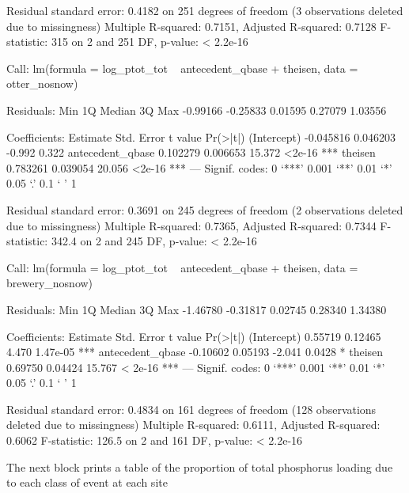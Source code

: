 \documentclass[12pt]{article}
\begin{document}
\begin{Schunk}
\begin{Soutput}
Residual standard error: 0.4182 on 251 degrees of freedom
  (3 observations deleted due to missingness)
Multiple R-squared: 0.7151,	Adjusted R-squared: 0.7128 
F-statistic:   315 on 2 and 251 DF,  p-value: < 2.2e-16 
\end{Soutput}
\begin{Soutput}
Call:
lm(formula = log_ptot_tot ~ antecedent_qbase + theisen, data = otter_nosnow)

Residuals:
     Min       1Q   Median       3Q      Max 
-0.99166 -0.25833  0.01595  0.27079  1.03556 

Coefficients:
                  Estimate Std. Error t value Pr(>|t|)    
(Intercept)      -0.045816   0.046203  -0.992    0.322    
antecedent_qbase  0.102279   0.006653  15.372   <2e-16 ***
theisen           0.783261   0.039054  20.056   <2e-16 ***
---
Signif. codes:  0 ‘***’ 0.001 ‘**’ 0.01 ‘*’ 0.05 ‘.’ 0.1 ‘ ’ 1 

Residual standard error: 0.3691 on 245 degrees of freedom
  (2 observations deleted due to missingness)
Multiple R-squared: 0.7365,	Adjusted R-squared: 0.7344 
F-statistic: 342.4 on 2 and 245 DF,  p-value: < 2.2e-16 
\end{Soutput}
\begin{Soutput}
Call:
lm(formula = log_ptot_tot ~ antecedent_qbase + theisen, data = brewery_nosnow)

Residuals:
     Min       1Q   Median       3Q      Max 
-1.46780 -0.31817  0.02745  0.28340  1.34380 

Coefficients:
                 Estimate Std. Error t value Pr(>|t|)    
(Intercept)       0.55719    0.12465   4.470 1.47e-05 ***
antecedent_qbase -0.10602    0.05193  -2.041   0.0428 *  
theisen           0.69750    0.04424  15.767  < 2e-16 ***
---
Signif. codes:  0 ‘***’ 0.001 ‘**’ 0.01 ‘*’ 0.05 ‘.’ 0.1 ‘ ’ 1 

Residual standard error: 0.4834 on 161 degrees of freedom
  (128 observations deleted due to missingness)
Multiple R-squared: 0.6111,	Adjusted R-squared: 0.6062 
F-statistic: 126.5 on 2 and 161 DF,  p-value: < 2.2e-16 
\end{Soutput}
\end{Schunk}










The next block prints a table of the proportion of total phosphorus loading due to each class of event at each site\\
\end{document}
